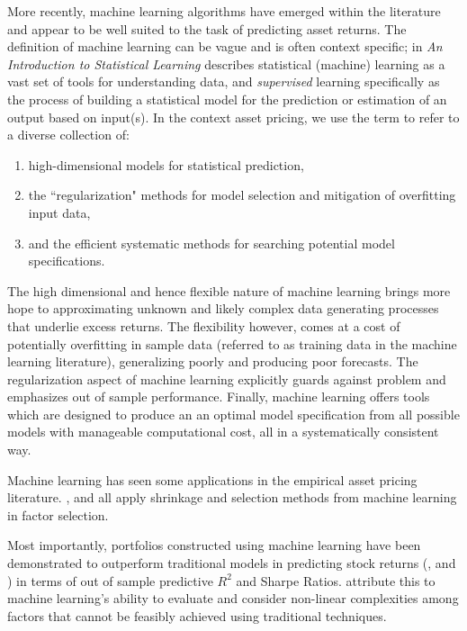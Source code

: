 \documentclass[a4paper, table]{article}
\begin{document}
More recently, machine learning algorithms have emerged within the literature and appear to be well suited to the task of predicting asset returns. The definition of machine learning can be vague and is often context specific; \cite{hastie_elements_2009} in \textit{An Introduction to Statistical Learning} describes statistical (machine) learning as a vast set of tools for understanding data, and \textit{supervised} learning specifically as the process of building a statistical model for the prediction or estimation of an output based on input(s). In the context asset pricing, we use the term to refer to a diverse collection of:

\begin{enumerate}
	\item high-dimensional models for statistical prediction, 
	\item the ``regularization" methods for model selection and mitigation of overfitting input data, 
	\item and the efficient systematic methods for searching potential model specifications.
\end{enumerate}

The high dimensional and hence flexible nature of machine learning brings more hope to approximating unknown and likely complex data generating processes that underlie excess returns. The flexibility however, comes at a cost of potentially overfitting in sample data (referred to as training data in the machine learning literature), generalizing poorly and producing poor forecasts. The regularization aspect of machine learning explicitly guards against problem and emphasizes out of sample performance. Finally, machine learning offers tools which are designed to produce an an optimal model specification from all possible models with manageable computational cost, all in a systematically consistent way.

Machine learning has seen some applications in the empirical asset pricing literature. \cite{kozak_shrinking_2017}, \cite{rapach_forecasting_2013} and \cite{freyberger_dissecting_2017} all apply shrinkage and selection methods from machine learning in factor selection.  

Most importantly, portfolios constructed using machine learning have been demonstrated to outperform traditional models in predicting stock returns (\cite{gu_empirical_2018}, \cite{hsu_finding_2014} and \cite{feng_deep_2018}) in terms of out of sample predictive $R^2$ and Sharpe Ratios. \cite{gu_empirical_2018} attribute this to machine learning's ability to evaluate and consider non-linear complexities among factors that cannot be feasibly achieved using traditional techniques. 
\end{document}
